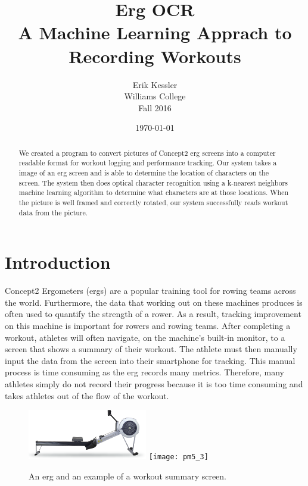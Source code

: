 \documentclass[a4paper,12pt]{article}
\newcommand{\projecttitle}{Erg OCR}
\begin{document}
\thispagestyle{plain}
\pagestyle{fancy}
\clearpage
\setlength{\headsep}{0.4in}


\title{Erg OCR\\ \large A Machine Learning Apprach to Recording Workouts}
\date{\today}
\author{
  {\rm Erik Kessler}\\
  Williams College\\
  Fall 2016
}

\maketitle

\chead{\projecttitle}
\cfoot{\thepage}

\begin{abstract}
We created a program to convert pictures of Concept2 erg screens into a computer readable format for workout logging and performance tracking. Our system takes a image of an erg screen and is able to determine the location of characters on the screen. The system then does optical character recognition using a k-nearest neighbors machine learning algorithm to determine what characters are at those locations. When the picture is well framed and correctly rotated, our system successfully reads workout data from the picture.
\end{abstract}


\section{Introduction}
Concept2 Ergometers (ergs) are a popular training tool for rowing teams across the world. Furthermore, the data that working out on these machines produces is often used to quantify the strength of a rower. As a result, tracking improvement on this machine is important for rowers and rowing teams. After completing a workout, athletes will often navigate, on the machine\rq s built-in monitor, to a screen that shows a summary of their workout. The athlete must then manually input the data from the screen into their smartphone for tracking. This manual process is time consuming as the erg records many metrics. Therefore, many athletes simply do not record their progress because it is too time consuming and takes athletes out of the flow of the workout.

\begin{figure}[h]
    \centering
    \includegraphics[width=.35\textwidth]{erg}
    \texttt{[image: pm5\_3]}
    \caption{An erg and an example of a workout summary screen.}
    \label{fig:erg}
\end{figure}
\end{document}
